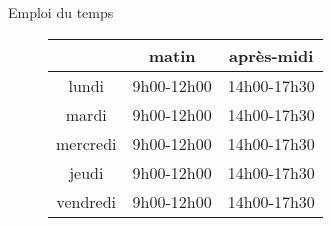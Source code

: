 \begin{frame}{Emploi du temps}
  \begin{figure}
    \centering
    \begin{tabular}{ccc}
      \toprule
               & matin      & après-midi  \\
      \midrule
      lundi    & 9h00-12h00 & 14h00-17h30 \\
      mardi    & 9h00-12h00 & 14h00-17h30 \\
      mercredi & 9h00-12h00 & 14h00-17h30 \\
      jeudi    & 9h00-12h00 & 14h00-17h30 \\
      vendredi & 9h00-12h00 & 14h00-17h30 \\
      \bottomrule
    \end{tabular}
  \end{figure}
\end{frame}

